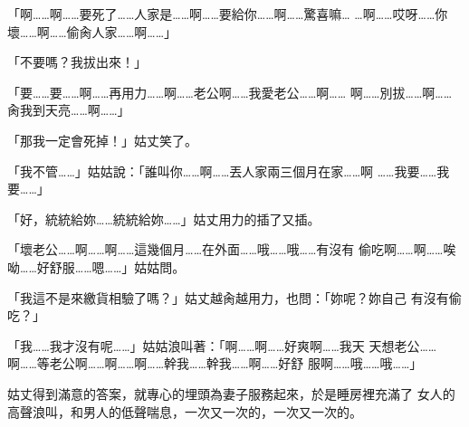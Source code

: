 「啊……啊……要死了……人家是……啊……要給你……啊……驚喜嘛…
…啊……哎呀……你壞……啊……偷肏人家……啊……」

「不要嗎？我拔出來！」

「要……要……啊……再用力……啊……老公啊……我愛老公……啊……
啊……別拔……啊……肏我到天亮……啊……」

「那我一定會死掉！」姑丈笑了。

「我不管……」姑姑說：「誰叫你……啊……丟人家兩三個月在家……啊
……我要……我要……」

「好，統統給妳……統統給妳……」姑丈用力的插了又插。

「壞老公……啊……啊……這幾個月……在外面……哦……哦……有沒有
偷吃啊……啊……唉呦……好舒服……嗯……」姑姑問。

「我這不是來繳貨相驗了嗎？」姑丈越肏越用力，也問：「妳呢？妳自己
有沒有偷吃？」

「我……我才沒有呢……」姑姑浪叫著：「啊……啊……好爽啊……我天
天想老公……啊……等老公啊……啊……啊……幹我……幹我……啊……好舒
服啊……哦……哦……」

姑丈得到滿意的答案，就專心的埋頭為妻子服務起來，於是睡房裡充滿了
女人的高聲浪叫，和男人的低聲喘息，一次又一次的，一次又一次的。










